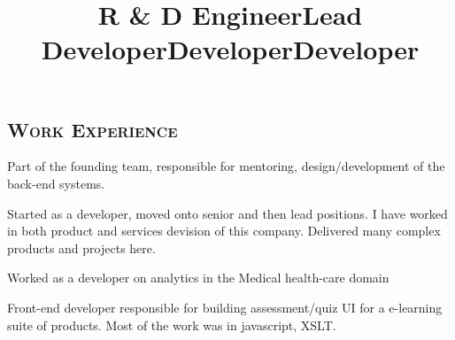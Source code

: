 \begin{resume}
\section{\textsc{Work Experience}}

\title{R \& D Engineer}
\begin{position}
Part of the founding team, responsible for mentoring, design/development of the back-end systems. 
\end{position}


\title{Lead Developer}
\begin{position}
Started as a developer, moved onto senior and then lead positions. I have worked in both product and services devision of this company. Delivered many complex products and projects here.
\end{position}

\title{Developer}
\begin{position}
Worked as a developer on analytics in the Medical health-care domain
\end{position}

\title{Developer}
\begin{position}
Front-end developer responsible  for building assessment/quiz UI for a e-learning suite of products. Most of the work was in javascript, XSLT. 
\end{position}






\begin{formatb}
  \\
  \body\\
\end{formatb}


\end{resume}
